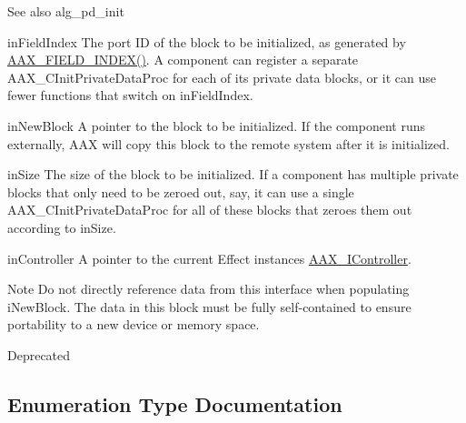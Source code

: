 \begin{DoxySeeAlso}{See also}
alg\+\_\+pd\+\_\+init
\end{DoxySeeAlso}
\begin{DoxyParagraph}{in\+Field\+Index}
The port ID of the block to be initialized, as generated by \mbox{\hyperlink{a00392_acf807247ecd6e5899dc9dc31644e9a1d}{A\+A\+X\+\_\+\+F\+I\+E\+L\+D\+\_\+\+I\+N\+D\+E\+X()}}. A component can register a separate A\+A\+X\+\_\+\+C\+Init\+Private\+Data\+Proc for each of its private data blocks, or it can use fewer functions that switch on {\ttfamily in\+Field\+Index}.
\end{DoxyParagraph}
\begin{DoxyParagraph}{in\+New\+Block}
A pointer to the block to be initialized. If the component runs externally, A\+AX will copy this block to the remote system after it is initialized.
\end{DoxyParagraph}
\begin{DoxyParagraph}{in\+Size}
The size of the block to be initialized. If a component has multiple private blocks that only need to be zeroed out, say, it can use a single A\+A\+X\+\_\+\+C\+Init\+Private\+Data\+Proc for all of these blocks that zeroes them out according to {\ttfamily in\+Size}.
\end{DoxyParagraph}
\begin{DoxyParagraph}{in\+Controller}
A pointer to the current Effect instance\textquotesingle{}s \mbox{\hyperlink{a01789}{A\+A\+X\+\_\+\+I\+Controller}}. 
\end{DoxyParagraph}
\begin{DoxyNote}{Note}
Do not directly reference data from this interface when populating {\ttfamily i\+New\+Block}. The data in this block must be fully self-\/contained to ensure portability to a new device or memory space. 
\end{DoxyNote}
\begin{DoxyRefDesc}{Deprecated}
\item[\mbox{\hyperlink{a00788__deprecated000004}{Deprecated}}]\end{DoxyRefDesc}


\subsection{Enumeration Type Documentation}
\mbox{\label{a00401_af0682195d377392ad356fd2b00c36892}} 
